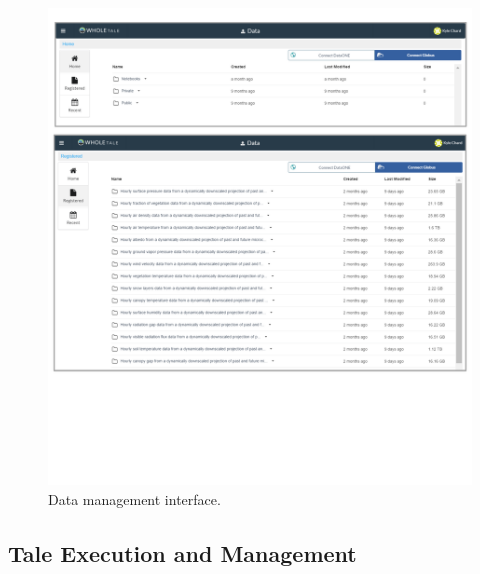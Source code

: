 \documentclass{elsarticle}
\begin{document}
\begin{figure}[ht!]
\centering
  \includegraphics[trim=0in 3in 0in 0in,clip,width=0.75\columnwidth]{data-management.pdf}
\caption{Data management interface. \label{fig:datamanagment}}
\end{figure}

\subsection{Tale Execution and Management}
\end{document}
